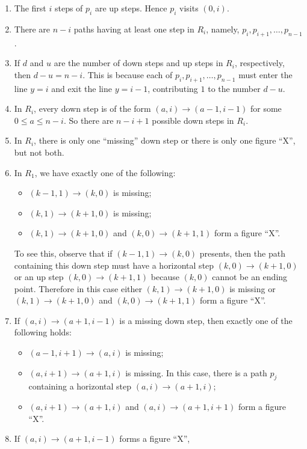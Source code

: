 \documentclass[oneside]{book}
\numberwithin{equation}{section}
\theoremstyle{definition}
\begin{document}
\begin{enumerate}
\item The first \( i \) steps of \( p_i \) are up steps. Hence
  \( p_i \) visits \( (0,i) \).
\item There are \( n-i \) paths having at
  least one step in \( R_i \), namely,
  \( p_{i},p_{i+1},\dots,p_{n-1} \).
\item If \( d \) and \( u \) are the number of down steps and up steps
  in \( R_i \), respectively, then \( d-u = n-i \). This is because
  each of \( p_{i},p_{i+1},\dots,p_{n-1} \) must enter the line
  \( y=i \) and exit the line \( y=i-1 \), contributing \( 1 \) to the
  number \( d-u \).
\item In \( R_i \), every down step is of the form
  \( (a,i)\to (a-1,i-1) \) for some \( 0\le a\le n-i \). So there are
  \( n-i+1 \) possible down steps in \( R_i \).
\item In \( R_i \), there is only one ``missing'' down step or there
  is only one figure ``X'', but not both.
\item In \( R_1 \), we have exactly one of the following:
  \begin{itemize}
  \item \( (k-1,1)\to (k,0) \) is missing;
  \item \( (k,1)\to (k+1,0) \) is missing;
  \item \( (k,1)\to (k+1,0) \) and \( (k,0)\to (k+1,1) \)
    form a figure ``X''.
  \end{itemize}
  To see this, observe that if \( (k-1,1)\to (k,0) \) presents, then
  the path containing this down step must have a horizontal step
  \( (k,0)\to(k+1,0) \) or an up step \( (k,0)\to (k+1,1) \) because
  \( (k,0) \) cannot be an ending point. Therefore in this case either
  \( (k,1)\to (k+1,0) \) is missing or \( (k,1)\to (k+1,0) \) and
  \( (k,0)\to (k+1,1) \) form a figure ``X''.
\item If \( (a,i)\to (a+1,i-1) \) is a missing down step,
  then exactly one of the following holds:
  \begin{itemize}
  \item \( (a-1,i+1)\to (a,i) \) is missing;
  \item \( (a,i+1)\to (a+1,i) \) is missing. In this case, there is a
    path \( p_j \) containing a horizontal step
    \( (a,i)\to (a+1,i) \);
  \item \( (a,i+1)\to (a+1,i) \) and \( (a,i)\to (a+1,i+1) \)
    form a figure ``X''.
  \end{itemize}
\item If \( (a,i)\to (a+1,i-1) \) forms a figure ``X'',

\end{enumerate}
\end{document}
